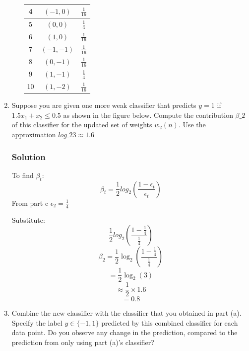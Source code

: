\documentclass{article}
\begin{document}
\begin{enumerate}[label=\alph*)]
\begin{itemize}
\begin{table}[h!]
\begin{tabular}{|c|c|c|}
         4 & $(-1, 0)$ & \(\frac{1}{16}\) \\
         \hline
         5 & $(0, 0)$ & \(\frac{1}{4}\) \\
         \hline
         6 & $(1, 0)$ & \(\frac{1}{16}\) \\
         \hline
         7 & $(-1, -1)$ & \(\frac{1}{16}\) \\
         \hline
         8 & $(0, -1)$ & \(\frac{1}{16}\) \\
         \hline
         9 & $(1, -1)$ & \(\frac{1}{4}\) \\
         \hline
         10 & $(1, -2)$ & \(\frac{1}{16}\) \\
         \hline
         \end{tabular}
      \end{table}
   \end{itemize}

   \item Suppose you are given one more weak classifier that predicts \(y = 1\) if \(1.5x_1 + x_2 \leq 0.5\) as shown in the figure below. Compute the contribution \(\beta\_2\)
   of this classifier for the updated set of weights \(w_2(n)\). Use the approximation \(log\_2 3 \approx 1.6\)
   \subsubsection*{Solution}
   To find \(\beta_t\):
   \[
   \beta_t = \frac{1}{2} log_2 \left(\frac{1 - \epsilon_t}{\epsilon_t}\right)
   \]
   From part c \(\epsilon_2 = \frac{1}{4}\)

   Substitute:
   \[
   \frac{1}{2} log_2 \left(\frac{1 - \frac{1}{4}}{\frac{1}{4}}\right)
   \]
   \[
   \beta_2 = \frac{1}{2} \log_2 \left(\frac{1 - \frac{1}{4}}{\frac{1}{4}}\right)
   \]
   \[
   = \frac{1}{2} \log_2 (3)
   \]
   \[
   \approx \frac{1}{2} \times 1.6
   \]
   \[
   = 0.8
   \]

   \item Combine the new classifier with the classifier that you obtained in part (a). Specify the label \( y \in \{-1, 1\} \) predicted by this combined classifier for each 
   data point. Do you observe any change in the prediction, compared to the prediction from only using part (a)'s classifier?

\end{enumerate}
\end{document}
